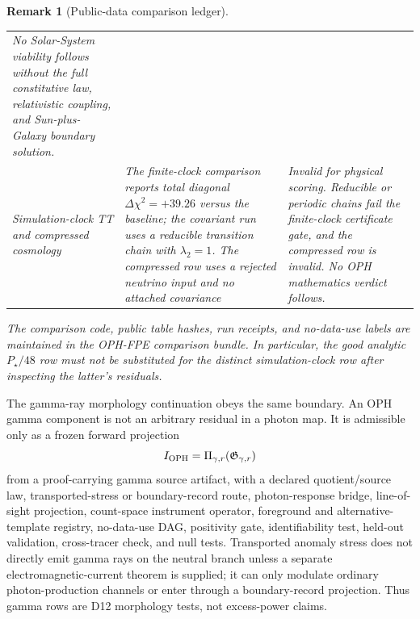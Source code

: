 \documentclass[11pt]{article}
\newtheorem{remark}[theorem]{Remark}
\begin{document}
\begin{remark}[Public-data comparison ledger]
\begin{center}
\begin{tabular}{@{}>{\raggedright\arraybackslash}p{}>{\raggedright\arraybackslash}p{}>{\raggedright\arraybackslash}p{}@{}}
No Solar-System viability follows without the full constitutive law, relativistic coupling, and Sun-plus-Galaxy boundary solution.\\
Simulation-clock TT and compressed cosmology &
The finite-clock comparison reports total diagonal
\(\Delta\chi^2=+39.26\) versus the baseline; the covariant run uses a reducible
transition chain with \(\lambda_2=1\). The compressed row uses a rejected
neutrino input and no attached covariance &
Invalid for physical scoring. Reducible or periodic chains fail the
finite-clock certificate gate, and the compressed row is invalid. No
OPH mathematics verdict follows.\\
\bottomrule
\end{tabular}
\end{center}
The comparison code, public table hashes, run receipts, and no-data-use labels
are maintained in the OPH-FPE comparison bundle.  In particular, the good
analytic \(P_\star/48\) row must not be substituted for the distinct
simulation-clock row after inspecting the latter's residuals.
\end{remark}

The gamma-ray morphology continuation obeys the same boundary. An OPH gamma
component is not an arbitrary residual in a photon map. It is admissible only as
a frozen forward projection
\[
I_{\rm OPH}=\Pi_{\gamma,r}(\mathfrak G_{\gamma,r})
\]
from a proof-carrying gamma source artifact, with a declared quotient/source
law, transported-stress or boundary-record route, photon-response bridge,
line-of-sight projection, count-space instrument operator, foreground and
alternative-template registry, no-data-use DAG, positivity gate, identifiability
test, held-out validation, cross-tracer check, and null tests. Transported
anomaly stress does not directly emit gamma rays on the neutral branch unless a
separate electromagnetic-current theorem is supplied; it can only modulate
ordinary photon-production channels or enter through a boundary-record
projection. Thus gamma rows are D12 morphology tests, not excess-power claims.
\end{document}
